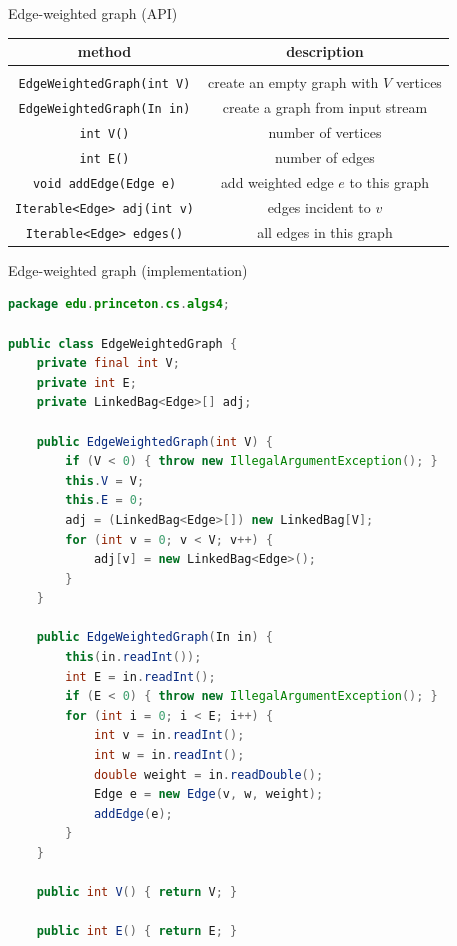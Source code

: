 \documentclass[8pt,a4paper,compress]{beamer}
\begin{document}
\begin{frame}[fragile]
Edge-weighted graph (API)

\begin{center}
\begin{tabular}{cc}
method & description \\ \hline \\
\lstinline$EdgeWeightedGraph(int V)$ & create an empty graph with $V$ vertices \\
\lstinline$EdgeWeightedGraph(In in)$ & create a graph from input stream \\
\lstinline$int V()$ & number of vertices  \\
\lstinline$int E()$ & number of edges \\
\lstinline$void addEdge(Edge e)$ & add weighted edge $e$ to this graph \\
\lstinline$Iterable<Edge> adj(int v)$ & edges incident to $v$ \\
\lstinline$Iterable<Edge> edges()$ & all edges in this graph
\end{tabular}  
\end{center}
\end{frame}

\begin{frame}[fragile]
Edge-weighted graph (implementation)
\begin{lstlisting}[language=Java]
package edu.princeton.cs.algs4;

public class EdgeWeightedGraph {
    private final int V;
    private int E;
    private LinkedBag<Edge>[] adj;
    
    public EdgeWeightedGraph(int V) {
        if (V < 0) { throw new IllegalArgumentException(); }
        this.V = V;
        this.E = 0;
        adj = (LinkedBag<Edge>[]) new LinkedBag[V];
        for (int v = 0; v < V; v++) {
            adj[v] = new LinkedBag<Edge>();
        }
    }

    public EdgeWeightedGraph(In in) {
        this(in.readInt());
        int E = in.readInt();
        if (E < 0) { throw new IllegalArgumentException(); }
        for (int i = 0; i < E; i++) {
            int v = in.readInt();
            int w = in.readInt();
            double weight = in.readDouble();
            Edge e = new Edge(v, w, weight);
            addEdge(e);
        }
    }
    
    public int V() { return V; }

    public int E() { return E; }
\end{lstlisting}
\end{frame}
\end{document}

